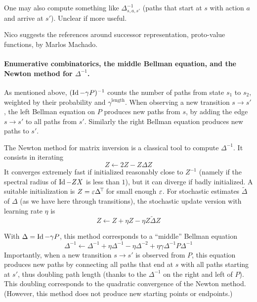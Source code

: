 \documentclass[11pt,a4paper]{article}
\begin{document}
One may also compute something like $\Delta^{-1}_{s,a,s'}$ (paths that start
at $s$ with action $a$ and arrive at $s'$). Unclear if more useful.

Nico suggests the references around successor representation, proto-value
functions, by Marlos Machado.

\paragraph{Enumerative combinatorics, the middle Bellman equation, and
the Newton method for $\Delta^{-1}$.} As mentioned above, $(\operatorname{Id}-\gamma
P)^{-1}$ counts the number of paths from state $s_1$ to $s_2$, weighted
by their probability and $\gamma^\mathrm{length}$. When observing a new
transition $s\to s'$, the left Bellman equation on $P$ produces new paths
from $s$, by adding the edge $s\to s'$ to all paths from $s'$. Similarly
the right Bellman equation produces new paths to $s'$.

The Newton method for matrix inversion is a classical tool to compute
$\Delta^{-1}$. It consists in iterating
\begin{equation}
Z\gets 2Z-Z\Delta Z
\end{equation}
It converges extremely fast if initialized reasonably close to $Z^{-1}$ (namely if the spectral
radius of $\operatorname{Id}-ZX$ is less than $1$), but it can diverge if badly
initialized. A suitable initialization is $Z=\varepsilon\Delta^{\!\top}\!$ for
small enough $\varepsilon$. For stochastic estimates $\tilde \Delta$ of $\Delta$ (as we have
here through transitions), the stochastic update version with learning
rate $\eta$ is
\begin{equation}
Z\gets Z+\eta Z-\eta Z\tilde \Delta Z
\end{equation}

With $\Delta=\operatorname{Id}-\gamma P$, 
this method corresponds to a ``middle'' Bellman equation
\begin{equation}
\Delta^{-1}\gets \Delta^{-1}+\eta\Delta^{-1}-\eta \Delta^{-2}+\eta \gamma \Delta^{-1}P\Delta^{-1}
\end{equation}
Importantly, when a new transition $s\to s'$ is observed from $P$, this equation
produces new paths by connecting all paths that end at $s$ with all paths
starting at $s'$, thus doubling path length (thanks to the $\Delta^{-1}$
on the right and left of $P$). This doubling corresponds to the
quadratic convergence of the Newton method. (However, this method does not
produce new starting points or endpoints.)
\end{document}
